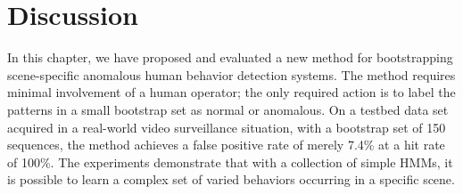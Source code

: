 \section{Discussion}
\label{sec:batch-discussion}

In this chapter, we have proposed and evaluated a new method for
bootstrapping scene-specific anomalous human behavior detection
systems.  The method requires minimal involvement of a human operator;
the only required action is to label the patterns in a small bootstrap
set as normal or anomalous.  On a testbed data set acquired in a
real-world video surveillance situation, with a bootstrap set of 150
sequences, the method achieves a false positive rate of merely 7.4\%
at a hit rate of 100\%.  The experiments demonstrate that with a
collection of simple HMMs, it is possible to learn a complex set of
varied behaviors occurring in a specific scene.

\FloatBarrier




